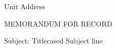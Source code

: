 \documentclass{article}
\begin{document}
Unit
Address


MEMORANDUM FOR RECORD

Subject: Titlecased Subject line
\end{document}
